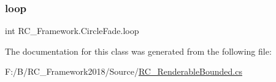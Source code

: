 \subsubsection{\texorpdfstring{loop}{loop}}
{\footnotesize\ttfamily int R\+C\+\_\+\+Framework.\+Circle\+Fade.\+loop}



The documentation for this class was generated from the following file\+:\begin{DoxyCompactItemize}
\item 
F\+:/\+B/\+R\+C\+\_\+\+Framework2018/\+Source/\mbox{\hyperlink{_r_c___renderable_bounded_8cs}{R\+C\+\_\+\+Renderable\+Bounded.\+cs}}\end{DoxyCompactItemize}
